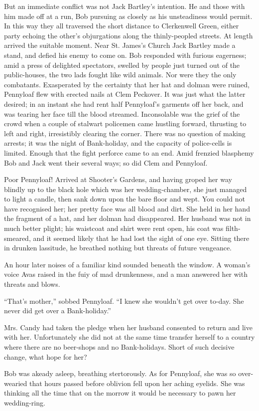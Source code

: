 But an immediate conflict was not Jack Bartley's intention. He and those
with him made off at a run, Bob pursuing as closely as his unsteadiness
would permit. In this way they all traversed the short distance to
Clerkenwell Green, either party echoing the other's objurgations along
the thinly-peopled streets. At length arrived the suitable moment. Near
St. James's Church Jack Bartley made a stand, and defied his enemy to
come on. Bob responded with furious eagerness; amid a press of delighted
spectators, swelled by people just turned out of the public-houses, the
two lads {\protect\hypertarget{273}{}{}}fought like wild animals. Nor
were they the only combatants. Exasperated by the certainty that her hat
and dolman were ruined, Pennyloaf flew with erected nails at Clem
Peckover. It was just what the latter desired; in an instant she had
rent half Pennyloaf's garments off her back, and was tearing her face
till the blood streamed. Inconsolable was the grief of the crowd when a
couple of stalwart policemen came hustling forward, thrusting to left
and right, irresistibly clearing the corner. There was no question of
making arrests; it was the night of Bank-holiday, and the capacity of
police-cells is limited. Enough that the fight perforce came to an end.
Amid frenzied blasphemy Bob and Jack went their several ways; so did
Clem and Pennyloaf.

Poor Pennyloaf! Arrived at Shooter's Gardens, and having groped her way
blindly up to the black hole which was her wedding-chamber, she just
managed to light a candle, then sank down upon the bare floor and wept.
You could not have recognised her; her pretty face was all blood and
dirt. She held in her {\protect\hypertarget{274}{}{}}hand the fragment
of a hat, and her dolman had disappeared. Her husband was not in much
better plight; his waistcoat and shirt were rent open, his coat was
filth-smeared, and it seemed likely that he had lost the sight of one
eye. Sitting there in drunken lassitude, he breathed nothing but threats
of future vengeance.

An hour later noises of a familiar kind sounded beneath the window. A
woman's voice Avas raised in the fuiy of mad drunkenness, and a man
answered her with threats and blows.

``That's mother,'' sobbed Pennyloaf. ``I knew she wouldn't get over
to-day. She never did get over a Bank-holiday.''

Mrs. Candy had taken the pledge when her husband consented to return and
live with her. Unfortunately she did not at the same time transfer
herself to a country where there are no beer-shops and no Bank-holidays.
Short of such decisive change, what hope for her?

Bob was akeady asleep, breathing
{\protect\hypertarget{275}{}{}}stertorously. As for Pennyloaf, she was
so over-wearied that hours passed before oblivion fell upon her aching
eyelids. She was thinking all the time that on the morrow it would be
necessary to pawn her wedding-ring.

